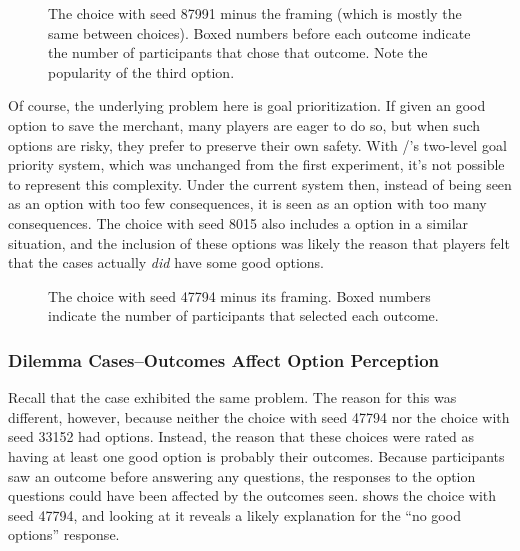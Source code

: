 \begin{figure}[t]
\caption[``Expected failure'' choice 87991]{The choice with seed 87991 minus the framing (which is mostly the same between choices). Boxed numbers before each outcome indicate the number of participants that chose that outcome. Note the popularity of the third option.}
\label{fig:e2-seed-87991}
\end{figure}


Of course, the underlying problem here is goal prioritization.
%
If given an good option to save the merchant, many players are eager to do so, but when such options are risky, they prefer to preserve their own safety.
%
With \dunyazad/'s two-level goal priority system, which was unchanged from the first experiment, it's not possible to represent this complexity.
%
Under the current system then, instead of  being seen as an option with too few consequences, it is seen as an option with too many consequences.
%
The choice with seed 8015 also includes a  option in a similar situation, and the inclusion of these options was likely the reason that players felt that the \expf{} cases actually \emph{did} have some good options.


\begin{figure}[h]
\caption[``Unexpected success'' choice 47794]{The \unxs{} choice with seed 47794 minus its framing. Boxed numbers indicate the number of participants that selected each outcome.}
\label{fig:e2-seed-47794}
\end{figure}


\subsubsection{Dilemma Cases--Outcomes Affect Option Perception}

Recall that the \unxs{} case exhibited the same problem.
%
The reason for this was different, however, because neither the choice with seed 47794 nor the choice with seed 33152 had  options.
%
Instead, the reason that these choices were rated as having at least one good option is probably their outcomes.
%
Because participants saw an outcome before answering any questions, the responses to the option questions could have been affected by the outcomes seen.
%
 shows the choice with seed 47794, and looking at it reveals a likely explanation for the ``no good options'' response.


